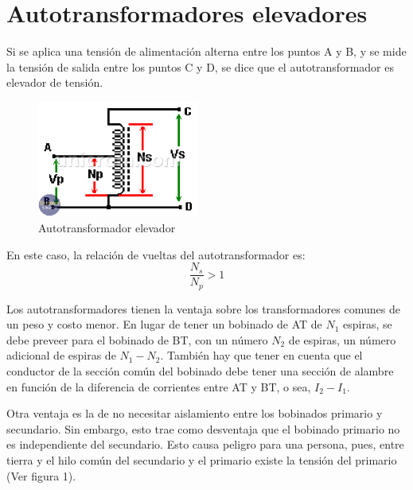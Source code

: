 \documentclass[11pt]{report}
\begin{document}
\section{Autotransformadores elevadores}
Si se aplica una tensión de alimentación alterna entre los puntos A y B, y se
mide la tensión de salida entre los puntos C y D, se dice que el
autotransformador es elevador de tensión.

\begin{figure}[h]
  \begin{center}
    \includegraphics[width=200px]{autotransformador-elevador.png}
  \end{center}
  \caption{Autotransformador elevador}
\end{figure}

En este caso, la relación de vueltas del autotransformador es:
\begin{equation}
  \frac{N_s}{N_p} > 1
\end{equation}

Los autotransformadores tienen la ventaja sobre los transformadores comunes
de un peso y costo menor. En lugar de tener un bobinado de AT de $N_1$ espiras,
se debe preveer para el bobinado de BT, con un número $N_2$ de espiras, un
número
adicional de espiras de $N_1-N_2$. También hay que tener en cuenta que el
conductor
de la sección común del bobinado debe tener una sección de alambre en función
de la
diferencia de corrientes entre AT y BT, o sea, $I_2-I_1$.

Otra ventaja es la de no necesitar aislamiento entre los bobinados primario y
secundario.
Sin embargo, esto trae como desventaja que el bobinado primario no es
independiente del
secundario. Esto causa peligro para una persona, pues, entre tierra y el hilo
común del
secundario y el primario existe la tensión del primario (Ver figura 1).
\end{document}
